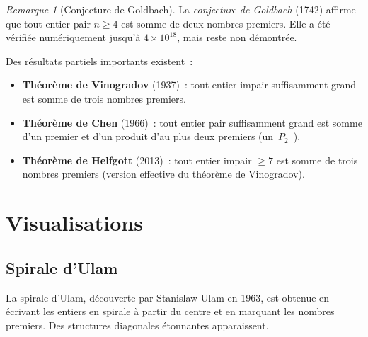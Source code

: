 \documentclass[12pt,a4paper,openany]{book}
\theoremstyle{definition}
\theoremstyle{plain}
\theoremstyle{remark}
\newtheorem{remarque}[definition]{Remarque}
\providecommand{\og}{\guillemotleft\,}
\providecommand{\fg}{\,\guillemotright}
\begin{document}
\begin{remarque}[Conjecture de Goldbach]
\label{rem:goldbach}
La \emph{conjecture de Goldbach} (1742) affirme que tout entier pair $n \geq 4$
est somme de deux nombres premiers. Elle a été vérifiée numériquement jusqu'à
$4 \times 10^{18}$, mais reste non démontrée.

Des résultats partiels importants existent~:
\begin{itemize}
  \item \textbf{Théorème de Vinogradov} (1937)~: tout entier
    impair suffisamment grand est somme de trois nombres premiers.
  \item \textbf{Théorème de Chen} (1966)~: tout entier pair
    suffisamment grand est somme d'un premier et d'un produit d'au plus deux premiers
    (un \og $P_2$ \fg{}).
  \item \textbf{Théorème de Helfgott} (2013)~: tout entier
    impair $\geq 7$ est somme de trois nombres premiers (version effective du
    théorème de Vinogradov).
\end{itemize}
\end{remarque}

\section{Visualisations}
\label{sec:ch2:visualisations}

\subsection{Spirale d'Ulam}
\label{subsec:ch2:ulam}


La spirale d'Ulam, découverte par Stanislaw
Ulam en 1963, est obtenue en écrivant les entiers en spirale à
partir du centre et en marquant les nombres premiers. Des structures diagonales
étonnantes apparaissent.
\end{document}
